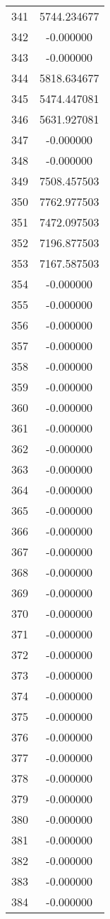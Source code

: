 \documentclass[12pt]{article}
\begin{document}
\begin{longtable}{@{}cc@{}}
341 & 5744.234677 \\
342 & -0.000000 \\
343 & -0.000000 \\
344 & 5818.634677 \\
345 & 5474.447081 \\
346 & 5631.927081 \\
347 & -0.000000 \\
348 & -0.000000 \\
349 & 7508.457503 \\
350 & 7762.977503 \\
351 & 7472.097503 \\
352 & 7196.877503 \\
353 & 7167.587503 \\
354 & -0.000000 \\
355 & -0.000000 \\
356 & -0.000000 \\
357 & -0.000000 \\
358 & -0.000000 \\
359 & -0.000000 \\
360 & -0.000000 \\
361 & -0.000000 \\
362 & -0.000000 \\
363 & -0.000000 \\
364 & -0.000000 \\
365 & -0.000000 \\
366 & -0.000000 \\
367 & -0.000000 \\
368 & -0.000000 \\
369 & -0.000000 \\
370 & -0.000000 \\
371 & -0.000000 \\
372 & -0.000000 \\
373 & -0.000000 \\
374 & -0.000000 \\
375 & -0.000000 \\
376 & -0.000000 \\
377 & -0.000000 \\
378 & -0.000000 \\
379 & -0.000000 \\
380 & -0.000000 \\
381 & -0.000000 \\
382 & -0.000000 \\
383 & -0.000000 \\
384 & -0.000000 \\

\end{longtable}
\end{document}
